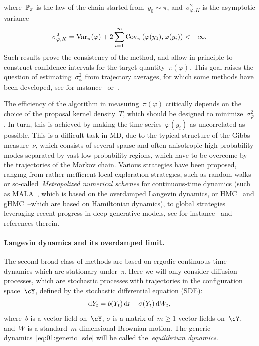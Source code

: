 where~$\P_\pi$ is the law of the chain started from~$y_0\sim\pi$, and~$\sigma_{\varphi,K}^2$ is the asymptotic variance
\begin{equation}
    \sigma_{\varphi,K}^2 = \Var_\pi(\varphi) + 2\sum_{i=1}^{\infty}\Cov_\pi\left(\varphi(y_0),\varphi(y_i)\right)<+\infty.
\end{equation}
Such results prove the consistency of the method, and allow in principle to construct confidence intervals for the target quantity~$\pi(\varphi)$. This goal raises the question of estimating~$\sigma_\varphi^2$ from trajectory averages, for which some methods have been developed, see for instance~\cite{FP89} or~\cite[Appendix D]{FS01}.

The efficiency of the algorithm in measuring~$\pi(\varphi)$ critically depends on the choice of the proposal kernel density~$T$, which should be designed to minimize~$\sigma^2_\varphi$. In turn, this is achieved by making the time series~$\varphi(y_i)$ as uncorrelated as possible. This is a difficult task in MD, due to the typical structure of the Gibbs measure~$\nu$, which consists of several sparse and often anisotropic high-probability modes separated by vast low-probability regions, which have to be overcome by the trajectories of the Markov chain.
Various strategies have been proposed, ranging from rather inefficient local exploration strategies, such as random-walks~\cite{MRTT53} or so-called~\textit{Metropolized numerical schemes} for continuous-time dynamics (such as MALA~\cite{RDF78,RR98}, which is based on the overdamped Langevin dynamics, or HMC~\cite{DKPR87} and gHMC~\cite{Ho91}--which are based on Hamiltonian dynamics), to global strategies leveraging recent progress in deep generative models, see for instance~\cite{NOKW19,GRV22,HMRSTW24} and references therein.

\paragraph{Langevin dynamics and its overdamped limit.}
The second broad class of methods are based on ergodic continuous-time dynamics which are stationary under~$\pi$.
Here we will only consider diffusion processes, which are stochastic processes with trajectories in the configuration space~$\cY$, defined by the stochastic differential equation (SDE):
\begin{equation}
    \label{eq:01:generic_sde}
    \d Y_t = b(Y_t)\,\d t + \sigma(Y_t)\,\d W_t,
\end{equation}
where~$b$ is a vector field on~$\cY$, $\sigma$ is a matrix of~$m\geq 1$ vector fields on~$\cY$, and~$W$ is a standard~$m$-dimensional Brownian motion.
The generic dynamics~\eqref{eq:01:generic_sde} will be called the~\textit{equilibrium dynamics}.

